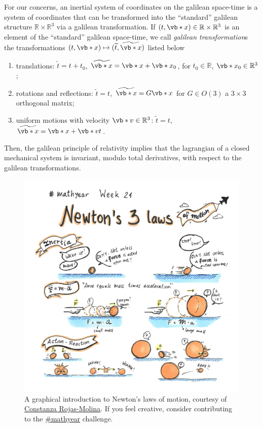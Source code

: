 \documentclass[english,fontsize=11pt,paper=b5]{scrbook}
\numberwithin{equation}{chapter}
\theoremstyle{definition}
\newcommand{\emphidx}[1]{\index{#1}\emph{#1}}
\begin{document}
    For our concerns, an inertial system of coordinates on the galilean space-time is a system of coordinates that can be transformed into the ``standard'' galilean structure $\mathbb{R}\times\mathbb{R}^3$ via a galilean transformation.
  If $(t, \vb*{x}) \in \mathbb{R}\times \mathbb{R}^3$ is an element of the ``standard'' galilean space-time, we call \emphidx{galilean transformation}s the transformations $(t,\vb*{x}) \mapsto (\widetilde t, \widetilde{\vb*{x}})$ listed below
    \begin{enumerate}
      \item translations: $\widetilde t = t + t_0$, $\widetilde{\vb*{x}} = \vb*{x} + \vb*{x}_0$, for $t_0\in\mathbb{R}$, $\vb*{x}_0\in\mathbb{R}^3$;
      \item rotations and reflections: $\widetilde t = t$, $\widetilde{\vb*{x}} = G\vb*{x}$ for $G\in O(3)$ a $3\times 3$ orthogonal matrix;
      \item uniform motions with velocity $\vb*{v}\in\mathbb{R}^3$: $\widetilde t = t$, $\widetilde{\vb*{x}} = \vb*{x} + \vb*{v} t$.
    \end{enumerate}
    Then, the galilean principle of relativity implies that the lagrangian of a closed mechanical system is invariant, modulo total derivatives, with respect to the galilean transformations. \medskip

    \begin{figure}[ht]
      \centering
      \includegraphics[width=.85\linewidth]{images/coni-mathyear-21-21.jpg}
      \caption{A graphical introduction to Newton's laws of motion,
        courtesy of \href{https://web.archive.org/web/20210602092955/https://twitter.com/Coni777/status/1399953219997032448}{Constanza Rojas-Molina}.
        If you feel creative, consider contributing to the
      \href{http://crojasmolina.com/illustration/the-mathyear-challenge/list-of-prompts-for-mathyear/}{\#mathyear} challenge.}
    \end{figure}
\end{document}
